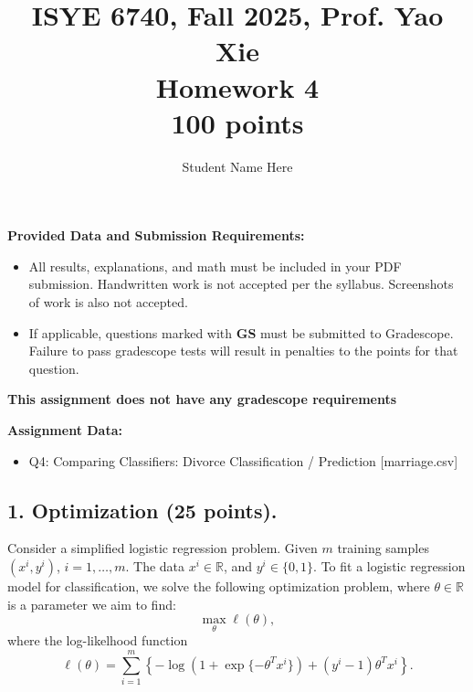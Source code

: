 \documentclass[12pt]{article}
\begin{document}
\title{ISYE 6740, Fall 2025, Prof. Yao Xie\\ Homework 4\\{\small 100 points}}
\author{Student Name Here}
\date{}
\maketitle

\vspace{-1cm}
\textbf{Provided Data and Submission Requirements:}
\begin{itemize}
    \item All results, explanations, and math must be included in your PDF submission. Handwritten work is not accepted per the syllabus. Screenshots of work is also not accepted.
    \item If applicable, questions marked with \textbf{GS} must be submitted to Gradescope. Failure to pass gradescope tests will result in penalties to the points for that question.
\end{itemize}

\textbf{This assignment does not have any gradescope requirements}

\textbf{Assignment Data:}
\begin{itemize}
    \item Q4: Comparing Classifiers: Divorce Classification / Prediction [marriage.csv]
\end{itemize}

\subsection*{1. Optimization (25 points).}

Consider a simplified logistic regression problem. 
Given $m$ training samples $(x^i, y^i)$, $i = 1, \ldots, m$. The data $x^i \in \mathbb R$, and $y^i \in \{0, 1\}$.  To fit a logistic regression model for classification, we solve the following optimization problem, where $\theta \in \mathbb R$ is a parameter we aim to find:
\begin{equation}
\max_\theta \ell (\theta), \label{eqn}
\end{equation}
where the log-likelhood function \[\ell(\theta) = \sum_{i=1}^m \left\{-\log (1+\exp\{-\theta^T x^i\}) + (y^i-1) \theta^T x^i\right\}.\]
\end{document}

